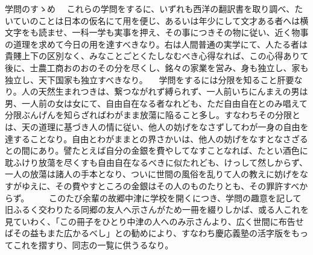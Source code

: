 \documentclass{ltjsarticle}
\begin{document}
\begin{itembox}[l]{学問のすゝめ}
　これらの学問をするに、いずれも西洋の翻訳書を取り調べ、たいていのことは日本の仮名にて用を便じ、あるいは年少にして文才ある者へは横文字をも読ませ、一科一学も実事を押え、その事につきその物に従い、近く物事の道理を求めて今日の用を達すべきなり。右は人間普通の実学にて、人たる者は貴賤上下の区別なく、みなことごとくたしなむべき心得なれば、この心得ありて後に、士農工商おのおのその分を尽くし、銘々の家業を営み、身も独立し、家も独立し、天下国家も独立すべきなり。
　学問をするには分限を知ること肝要なり。人の天然生まれつきは、繋つながれず縛られず、一人前いちにんまえの男は男、一人前の女は女にて、自由自在なる者なれども、ただ自由自在とのみ唱えて分限ぶんげんを知らざればわがまま放蕩に陥ること多し。すなわちその分限とは、天の道理に基づき人の情に従い、他人の妨げをなさずしてわが一身の自由を達することなり。自由とわがままとの界さかいは、他人の妨げをなすとなさざるとの間にあり。譬たとえば自分の金銀を費やしてなすことなれば、たとい酒色に耽ふけり放蕩を尽くすも自由自在なるべきに似たれども、けっして然しからず、一人の放蕩は諸人の手本となり、ついに世間の風俗を乱りて人の教えに妨げをなすがゆえに、その費やすところの金銀はその人のものたりとも、その罪許すべからず。
　　このたび余輩の故郷中津に学校を開くにつき、学問の趣意を記して旧ふるく交わりたる同郷の友人へ示さんがため一冊を綴りしかば、或る人これを見ていわく、「この冊子をひとり中津の人へのみ示さんより、広く世間に布告せばその益もまた広かるべし」との勧めにより、すなわち慶応義塾の活字版をもってこれを摺すり、同志の一覧に供うるなり。
\end{itembox}
\end{document}
